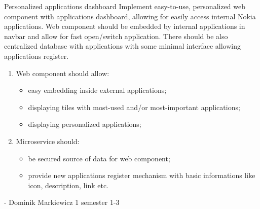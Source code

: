 \begin{project}
{Personalized applications dashboard}
{Implement easy-to-use, personalized web component with applications dashboard, allowing for easily access internal Nokia applications. Web component should be embedded by internal applications in navbar and allow for fast open/switch application. There should be also centralized database with applications with some minimal interface allowing applications register.}
{
\begin{enumerate}
	\item Web component should allow:
		\begin{itemize}
			\item easy embedding inside external applications;
			\item displaying tiles with most-used and/or most-important applications;
			\item displaying personalized applications;
		\end{itemize}
	\item Microservice should:
		\begin{itemize}
			\item be secured source of data for web component;
			\item provide new applications register mechanism with basic informations like icon, description, link etc.
		\end{itemize}
\end{enumerate}
}
{-}
{Dominik Markiewicz}
{1 semester}
{1-3}
\end{project}
